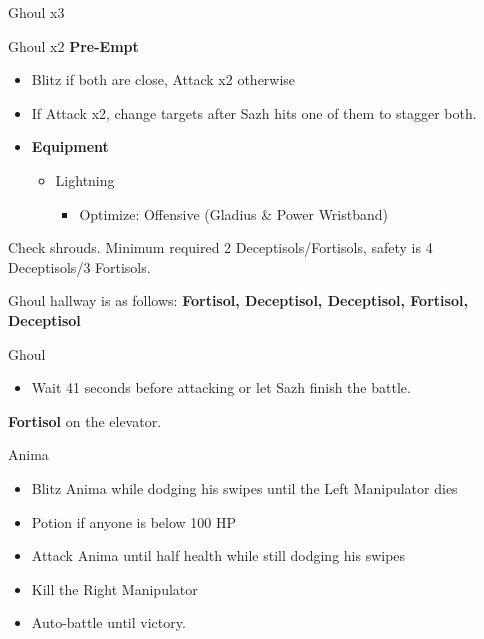 \begin{paracol}{2}
	\begin{battle}{Ghoul x3}
	\end{battle}

	\begin{battle}{Ghoul x2 \textbf{Pre-Empt}}
		\begin{itemize}
			\item Blitz if both are close, Attack x2 otherwise
			\item If Attack x2, change targets after Sazh hits one of them to stagger both.
		\end{itemize}
	\end{battle}


	\begin{menu}
		\begin{itemize}
			\item \textbf{Equipment}
			      \begin{itemize}
				      \item Lightning
				            \begin{itemize}
					            \item Optimize: Offensive (Gladius \& Power Wristband)
				            \end{itemize}
			      \end{itemize}
		\end{itemize}
	\end{menu}
	\switchcolumn*

	Check shrouds. Minimum required 2 Deceptisols/Fortisols, safety is 4 Deceptisols/3 Fortisols.

	Ghoul hallway is as follows: {\bf Fortisol, Deceptisol, Deceptisol, Fortisol, Deceptisol}

	\begin{battle}{Ghoul}
		\begin{itemize}
			\item Wait 41 seconds before attacking or let Sazh finish the battle.
		\end{itemize}
	\end{battle}

	\textbf{Fortisol} on the elevator.

	\begin{battle}{Anima}

		\begin{itemize}
			\item Blitz Anima while dodging his swipes until the Left Manipulator dies
			\item Potion if anyone is below 100 HP
			\item Attack Anima until half health while still dodging his swipes
			\item Kill the Right Manipulator
			\item Auto-battle until victory.
		\end{itemize}
	\end{battle}


\end{paracol}
